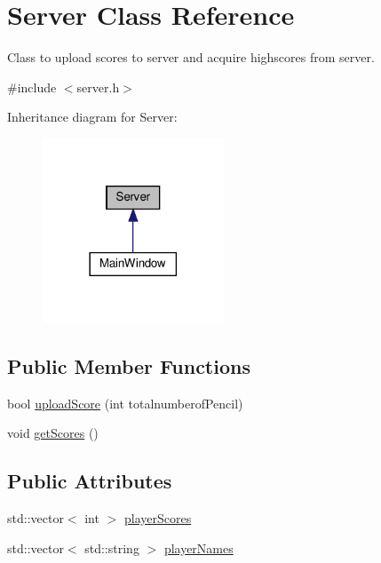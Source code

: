 \hypertarget{classServer}{}\section{Server Class Reference}
\label{classServer}


Class to upload scores to server and acquire highscores from server.  




{\ttfamily \#include $<$server.\+h$>$}



Inheritance diagram for Server\+:
\nopagebreak
\begin{figure}[H]
\begin{center}
\leavevmode
\includegraphics[width=153pt]{classServer__inherit__graph}
\end{center}
\end{figure}
\subsection*{Public Member Functions}
\begin{DoxyCompactItemize}
\item 
bool \hyperlink{classServer_a1675e8a33c0e4f9f2d51d3de16981e66}{upload\+Score} (int totalnumberof\+Pencil)
\item 
void \hyperlink{classServer_ad8a93d69ede1b02b2ef9ff6bd31a325a}{get\+Scores} ()
\end{DoxyCompactItemize}
\subsection*{Public Attributes}
\begin{DoxyCompactItemize}
\item 
std\+::vector$<$ int $>$ \hyperlink{classServer_ae3bc58033f416d6bb1ff65e37b75fdc0}{player\+Scores}
\item 
std\+::vector$<$ std\+::string $>$ \hyperlink{classServer_a814400b9c0b97860b692a608fffa0115}{player\+Names}
\end{DoxyCompactItemize}


